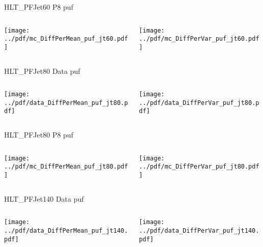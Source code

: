 \documentclass[9pt]{beamer}
\begin{document}
\begin{frame}[t]{HLT\_PFJet60 P8 puf}
\begin{columns}[T]
  \begin{column}{.5\textwidth}
  \texttt{[image: ../pdf/mc\_DiffPerMean\_puf\_jt60.pdf]}
  \end{column}
  \begin{column}{.5\textwidth}
  \texttt{[image: ../pdf/mc\_DiffPerVar\_puf\_jt60.pdf]}
  \end{column}
\end{columns}
\end{frame}

\begin{frame}[t]{HLT\_PFJet80 Data puf}
\begin{columns}[T]
  \begin{column}{.5\textwidth}
  \texttt{[image: ../pdf/data\_DiffPerMean\_puf\_jt80.pdf]}
  \end{column}
  \begin{column}{.5\textwidth}
  \texttt{[image: ../pdf/data\_DiffPerVar\_puf\_jt80.pdf]}
  \end{column}
\end{columns}
\end{frame}

\begin{frame}[t]{HLT\_PFJet80 P8 puf}
\begin{columns}[T]
  \begin{column}{.5\textwidth}
  \texttt{[image: ../pdf/mc\_DiffPerMean\_puf\_jt80.pdf]}
  \end{column}
  \begin{column}{.5\textwidth}
  \texttt{[image: ../pdf/mc\_DiffPerVar\_puf\_jt80.pdf]}
  \end{column}
\end{columns}
\end{frame}

\begin{frame}[t]{HLT\_PFJet140 Data puf}
\begin{columns}[T]
  \begin{column}{.5\textwidth}
  \texttt{[image: ../pdf/data\_DiffPerMean\_puf\_jt140.pdf]}
  \end{column}
  \begin{column}{.5\textwidth}
  \texttt{[image: ../pdf/data\_DiffPerVar\_puf\_jt140.pdf]}
  \end{column}
\end{columns}
\end{frame}
\end{document}

